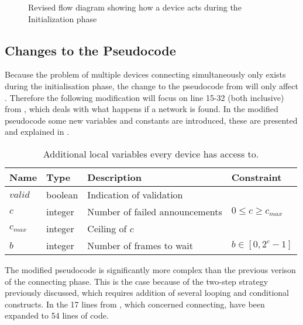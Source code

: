 \begin{figure}[h]
    \centering \footnotesize
    
    \caption{Revised flow diagram showing how a device acts during the Initialization phase}
    \label{fig:pseudo_flowMultiConnect}
\end{figure}


\subsection{Changes to the Pseudocode} %
\label{sub:changes_to_the_pseudocode}
Because the problem of multiple devices connecting simultaneously only exists during the initialisation phase, the change to the pseudocode from  will only affect .
Therefore the following modification will focus on line 15-32 (both inclusive) from , which deals with what happens if a network is found.
In the modified pseudocode some new variables and constants are introduced, these are presented and explained in .

\begin{table}[h]
    {\setlength{\extrarowheight}{1ex}%
    \begin{tabularx}{\textwidth}{l|l|X|l}
        \toprule
        Name                & Type      & Description & Constraint \\
        \midrule
        $valid$             & boolean   & Indication of validation              \\
        $c$                 & integer   & Number of failed announcements        & $0 \leq c \geq c_{max}$ \\
        $c_{max}$           & integer   & Ceiling of $c$                        \\
        $b$                 & integer   & Number of frames to wait              & $b \in [0, 2^c-1]$ \\
        \bottomrule
    \end{tabularx}}
    \caption{Additional local variables every device has access to.}
    \label{tab:locals_wmulticonnect}
\end{table}

The modified pseudocode is significantly more complex than the previous verison of the connecting phase.
This is the case because of the two-step strategy previously discussed, which requires addition of several looping and conditional constructs.
In  the 17 lines from , which concerned connecting, have been expanded to 54 lines of code. 

